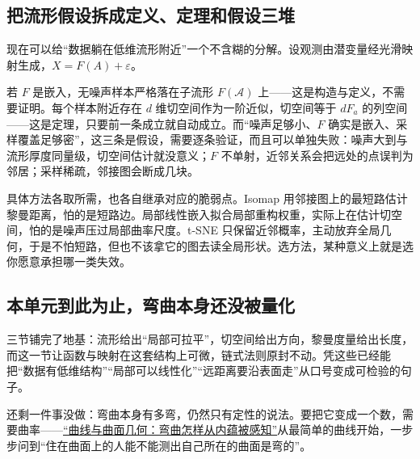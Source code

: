 \subsection{把流形假设拆成定义、定理和假设三堆}

现在可以给``数据躺在低维流形附近''一个不含糊的分解。设观测由潜变量经光滑映射生成，\(X=F(A)+\varepsilon\)。

若 \(F\) 是嵌入，无噪声样本严格落在子流形 \(F(\mathcal{A})\) 上——这是构造与定义，不需要证明。每个样本附近存在 \(d\) 维切空间作为一阶近似，切空间等于 \(dF_{a}\) 的列空间——这是定理，只要前一条成立就自动成立。而``噪声足够小、\(F\) 确实是嵌入、采样覆盖足够密''，这三条是假设，需要逐条验证，而且可以单独失败：噪声大到与流形厚度同量级，切空间估计就没意义；\(F\) 不单射，近邻关系会把远处的点误判为邻居；采样稀疏，邻接图会断成几块。

具体方法各取所需，也各自继承对应的脆弱点。Isomap 用邻接图上的最短路估计黎曼距离，怕的是短路边。局部线性嵌入拟合局部重构权重，实际上在估计切空间，怕的是噪声压过局部曲率尺度。t-SNE 只保留近邻概率，主动放弃全局几何，于是不怕短路，但也不该拿它的图去读全局形状。选方法，某种意义上就是选你愿意承担哪一类失效。

\subsection{本单元到此为止，弯曲本身还没被量化}

三节铺完了地基：流形给出``局部可拉平''，切空间给出方向，黎曼度量给出长度，而这一节让函数与映射在这套结构上可微，链式法则原封不动。凭这些已经能把``数据有低维结构''``局部可以线性化''``远距离要沿表面走''从口号变成可检验的句子。

还剩一件事没做：弯曲本身有多弯，仍然只有定性的说法。要把它变成一个数，需要曲率——\hyperref[ch:107]{``曲线与曲面几何：弯曲怎样从内蕴被感知''}从最简单的曲线开始，一步步问到``住在曲面上的人能不能测出自己所在的曲面是弯的''。
